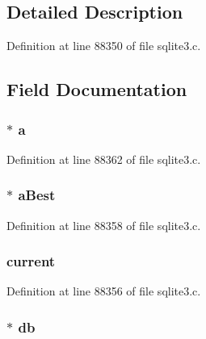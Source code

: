 \subsection{Detailed Description}


Definition at line 88350 of file sqlite3.\+c.



\subsection{Field Documentation}
\hypertarget{struct_stat4_accum_a31771a569b30ca80c82809abb99294f9}{}
\subsubsection[{a}]{$\ast$ a}\label{struct_stat4_accum_a31771a569b30ca80c82809abb99294f9}


Definition at line 88362 of file sqlite3.\+c.

\hypertarget{struct_stat4_accum_a297517497264a2509f5d49c2b2b2d6a3}{}
\subsubsection[{a\+Best}]{$\ast$ a\+Best}\label{struct_stat4_accum_a297517497264a2509f5d49c2b2b2d6a3}


Definition at line 88358 of file sqlite3.\+c.

\hypertarget{struct_stat4_accum_ac33cf9e2b2b87900f328d9b16a098582}{}
\subsubsection[{current}]{ current}\label{struct_stat4_accum_ac33cf9e2b2b87900f328d9b16a098582}


Definition at line 88356 of file sqlite3.\+c.

\hypertarget{struct_stat4_accum_ad6e663497d2c934364b3bcf07496b30b}{}
\subsubsection[{db}]{$\ast$ db}\label{struct_stat4_accum_ad6e663497d2c934364b3bcf07496b30b}


